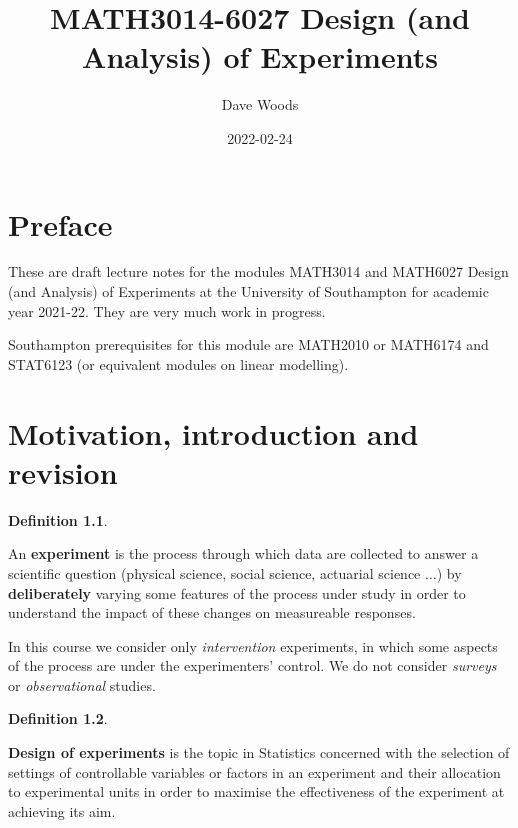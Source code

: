 \documentclass[
]{book}
\title{MATH3014-6027 Design (and Analysis) of Experiments}
\author{Dave Woods}
\date{2022-02-24}
\theoremstyle{definition}
\newtheorem{definition}{Definition}[chapter]
\theoremstyle{definition}
\theoremstyle{definition}
\theoremstyle{definition}
\theoremstyle{remark}
\begin{document}
\maketitle

{
\setcounter{tocdepth}{1}
\tableofcontents
}
\hypertarget{preface}{%
\chapter*{Preface}\label{preface}}

These are draft lecture notes for the modules MATH3014 and MATH6027 Design (and Analysis) of Experiments at the University of Southampton for academic year 2021-22. They are very much work in progress.

Southampton prerequisites for this module are MATH2010 or MATH6174 and STAT6123 (or equivalent modules on linear modelling).

\newcommand{\bx}{\boldsymbol{x}}
\newcommand{\btheta}{\boldsymbol{\theta}}
\newcommand{\bbeta}{\boldsymbol{\beta}}
\newcommand{\bvarepsilon}{\boldsymbol{\varepsilon}}
\newcommand{\by}{\boldsymbol{y}}
\newcommand{\rT}{\mathrm{T}}
\newcommand{\Var}{\operatorname{Var}}
\newcommand{\bY}{\boldsymbol{y}}
\newcommand{\btau}{\boldsymbol{\tau}}

\hypertarget{intro}{%
\chapter{Motivation, introduction and revision}\label{intro}}

\begin{definition}
\protect\hypertarget{def:exp}{}\label{def:exp}

An \textbf{experiment} is the process through which data are collected to answer a scientific question (physical science, social science, actuarial science \(\dots\)) by \textbf{deliberately} varying some features of the process under study in order to understand the impact of these changes on measureable responses.

In this course we consider only \emph{intervention} experiments, in which some aspects of the process are under the experimenters' control. We do not consider \emph{surveys} or \emph{observational} studies.

\end{definition}

\begin{definition}
\protect\hypertarget{def:design}{}\label{def:design}

\textbf{Design of experiments} is the topic in Statistics concerned with the selection of settings of controllable variables or factors in an experiment and their allocation to experimental units in order to maximise the effectiveness of the experiment at achieving its aim.

\end{definition}
\end{document}
